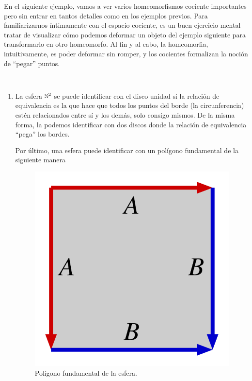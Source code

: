 En el siguiente ejemplo, vamos a ver varios homeomorfismos cociente importantes pero sin entrar en tantos detalles como en los ejemplos previos. Para familiarizarnos íntimamente con el espacio cociente, es un buen ejercicio mental tratar de visualizar cómo podemos deformar un objeto del ejemplo siguiente para transformarlo en otro homeomorfo. Al fin y al cabo, la homeomorfia, intuitivamente, es poder deformar sin romper, y los cocientes formalizan la noción de ``pegar'' puntos.
\begin{exa}\
	\begin{enumerate}
		\item La esfera $\mathbb{S}^2$ se puede identificar con el disco unidad si la relación de equivalencia es la que hace que todos los puntos del borde (la circunferencia) estén relacionados entre sí y los demás, solo consigo mismos. De la misma forma, la podemos identificar con dos discos donde la relación de equivalencia ``pega'' los bordes.
		
		Por último, una esfera puede identificar con un polígono fundamental de la siguiente manera
		
		\begin{figure}[h!]
			\centering
			\includegraphics[scale = 0.1]{img/pol_fund_esfera}
			\caption{Polígono fundamental de la esfera.}
		\end{figure}
		

\end{enumerate}
\end{exa}

